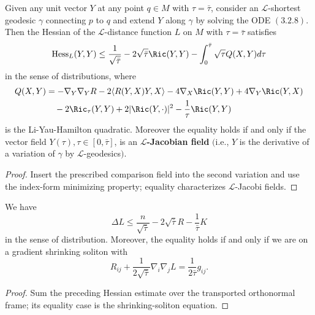 \begin{proposition}
  \label{prop:cz-l-jacobi-comparison-inequality}
Given any unit vector $Y$ at any point $q \in M$ with
$\tau=\bar{\tau}$, consider an $\mathcal{L}$-shortest geodesic
$\gamma$ connecting $p$ to $q$ and extend $Y$ along $\gamma$ by
solving the {\rm ODE} $(3.2.8)$. Then the Hessian of the
$\mathcal{L}$-distance function $L$ on $M$ with $\tau=\bar{\tau}$
satisfies
$$
{\rm
Hess}_L(Y,Y)\leq\frac{1}{\sqrt{\bar{\tau}}}-2\sqrt{\bar{\tau}}\Ric(Y,Y)
-\int_0^{\bar{\tau}}\sqrt{{\tau}}Q(X,Y)d\tau
$$
in the sense of distributions, where
\begin{align*}
Q(X,Y)&  = -\nabla_Y\nabla_YR-2\langle R(Y,X)Y,X\rangle
-4\nabla_X \Ric(Y,Y)+4\nabla_Y \Ric(Y,X)\\
&\quad -2\Ric_\tau(Y,Y)+2|\Ric(Y,\cdot)|^2-\frac{1}{\tau}\Ric(Y,Y)
\end{align*}
is the Li-Yau-Hamilton quadratic. Moreover the equality holds if
and only if the vector field $Y(\tau),\tau\in[0,\bar{\tau}]$, is
an {\bf $\mathcal{L}$-Jacobian field} $($i.e., $Y$ is the
derivative of a variation of $\gamma$ by
$\mathcal{L}$-geodesics$)$.
\end{proposition}

\begin{proof}
  \sketch Insert the prescribed comparison field into the second variation and use the index-form minimizing property; equality characterizes $\mathcal L$-Jacobi fields.
\end{proof}

\begin{corollary}
  \label{cor:cz-distributional-comparison-for-reduced-distance}
We have
$$
\Delta L\leq\frac{n}{\sqrt{\bar{\tau}}}
-2\sqrt{\bar{\tau}}R-\frac{1}{\bar{\tau}}K
$$
in the sense of distribution. Moreover, the equality holds if and
only if we are on a gradient shrinking soliton with
$$
R_{ij}+\frac{1}{2\sqrt{\bar\tau}}\nabla_i\nabla_jL
=\frac{1}{2\bar\tau}g_{ij}.$$
\end{corollary}

\begin{proof}
  \sketch Sum the preceding Hessian estimate over the transported orthonormal frame; its equality case is the shrinking-soliton equation.
\end{proof}

